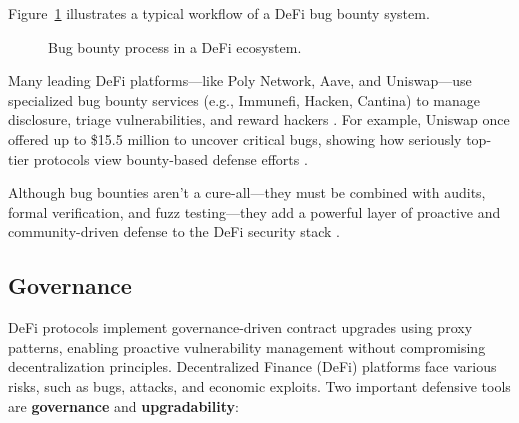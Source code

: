 \documentclass[conference]{IEEEtran}
\begin{document}
Figure~\ref{fig:bugbountyflow} illustrates a typical workflow of a DeFi bug bounty system.

\begin{figure}[h!]
\centering
{}
\caption{Bug bounty process in a DeFi ecosystem.}
\label{fig:bugbountyflow}
\end{figure}
\sloppy 
Many leading DeFi platforms—like Poly Network, Aave, and Uniswap—use specialized bug bounty services (e.g., Immunefi, Hacken, Cantina) to manage disclosure, triage vulnerabilities, and reward hackers \cite{turn0search15, turn0search12, streamflow_defi_security}. For example, Uniswap once offered up to \$15.5 million to uncover critical bugs, showing how seriously top-tier protocols view bounty-based defense efforts \cite{turn0search11}. \fussy

Although bug bounties aren't a cure-all—they must be combined with audits, formal verification, and fuzz testing—they add a powerful layer of proactive and community-driven defense to the DeFi security stack \cite{consensys_bugbounty, marcavage2023predicting}.


\subsection{Governance}
DeFi protocols implement governance-driven contract upgrades using proxy patterns, enabling proactive vulnerability management without compromising decentralization principles. Decentralized Finance (DeFi) platforms face various risks, such as bugs, attacks, and economic exploits. Two important defensive tools are \textbf{governance} and \textbf{upgradability}:
\end{document}
